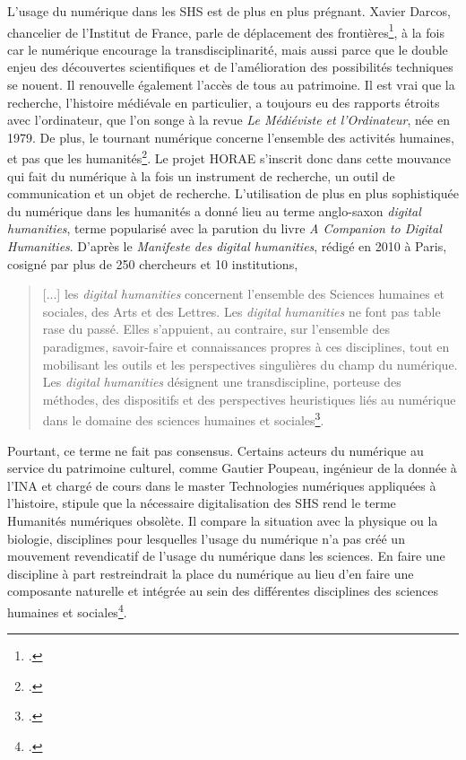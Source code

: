 \documentclass[a4paper,12pt,twoside]{book}
\begin{document}
	L'usage du numérique dans les SHS est de plus en plus prégnant. Xavier Darcos, chancelier de l'Institut de France, parle de \og déplacement des frontières\fg{}\footcite[p. 3]{recherche_HN}, à la fois car le numérique encourage la transdisciplinarité, mais aussi parce que le double enjeu des découvertes scientifiques et de l'amélioration des possibilités techniques se nouent. Il renouvelle également l'accès de tous au patrimoine. Il est vrai que la recherche, l'histoire médiévale en particulier, a toujours eu des rapports étroits avec l'ordinateur, que l'on songe à la revue \textit{Le Médiéviste et l'Ordinateur}, née en 1979. De plus, le \og tournant numérique\fg{} concerne l'ensemble des activités humaines, et pas que les humanités\footcite[p. 5]{recherche_HN}. Le projet HORAE s'inscrit donc dans cette mouvance qui fait du numérique à la fois un instrument de recherche, un outil de communication et un objet de recherche. L'utilisation de plus en plus sophistiquée du numérique dans les humanités a donné lieu au terme anglo-saxon \og \textit{digital humanities}\fg{}, terme popularisé avec la parution du livre \textit{A Companion to Digital Humanities}. D'après le \textit{Manifeste des digital humanities}, rédigé en 2010 à Paris, cosigné par plus de 250 chercheurs et 10 institutions,
	\begin{quote}
	    [...] les \textit{digital humanities} concernent l’ensemble des Sciences humaines et
sociales, des Arts et des Lettres. Les \textit{digital humanities} ne font pas table rase du passé.
Elles s’appuient, au contraire, sur l’ensemble des paradigmes, savoir-faire et
connaissances propres à ces disciplines, tout en mobilisant les outils et les
perspectives singulières du champ du numérique.
Les \textit{digital humanities} désignent une transdiscipline, porteuse des méthodes, des
dispositifs et des perspectives heuristiques liés au numérique dans le domaine des
sciences humaines et sociales\footcite[p. 7-8]{recherche_HN}.
	\end{quote}
	
	Pourtant, ce terme ne fait pas consensus. Certains acteurs du numérique au service du patrimoine culturel, comme Gautier Poupeau, ingénieur de la donnée à l'INA et chargé de cours dans le master \og Technologies numériques appliquées à l'histoire\fg{}, stipule que la nécessaire digitalisation des SHS rend le terme \og Humanités numériques\fg{} obsolète. Il compare la situation avec la physique ou la biologie, disciplines pour lesquelles l'usage du numérique n'a pas créé un mouvement revendicatif de l'usage du numérique dans les sciences. En faire une discipline à part restreindrait la place du numérique au lieu d'en faire une composante naturelle et intégrée au sein des différentes disciplines des sciences humaines et sociales\footcite{numerique_SHS}. 
	
\end{document}

